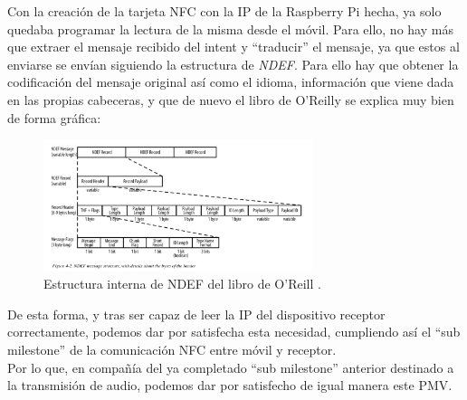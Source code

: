 Con la creación de la tarjeta NFC con la IP de la Raspberry Pi hecha, ya solo
quedaba programar la lectura de la misma desde el móvil. Para ello, no hay más
que extraer el mensaje recibido del intent y ``traducir'' el mensaje, ya que
estos al enviarse se envían siguiendo la estructura de \emph{NDEF}. Para ello
hay que obtener la codificación del mensaje original así como el idioma,
información que viene dada en las propias cabeceras, y que de nuevo el libro de
O'Reilly \cite{ndef-explicado} se explica muy bien de forma gráfica:

\begin{figure}[h!]
    \centering
    \includegraphics[width=0.7\textwidth]{fotos/estructura_ndef.png}
    \caption{Estructura interna de NDEF del libro de O’Reill \cite{ndef-explicado}.}
\end{figure}

De esta forma, y tras ser capaz de leer la IP del dispositivo receptor
correctamente, podemos dar por satisfecha esta necesidad, cumpliendo así el
``sub milestone'' de la comunicación NFC entre móvil y receptor.\\

Por lo que, en compañía del ya completado ``sub milestone'' anterior destinado a
la transmisión de audio, podemos dar por satisfecho de igual manera este PMV. 